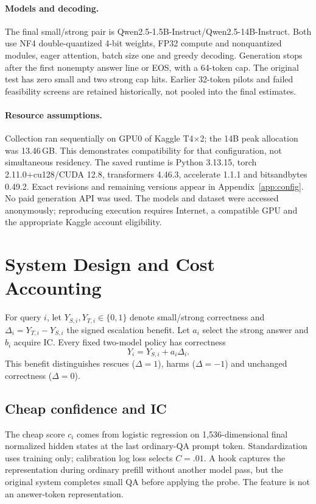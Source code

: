 \documentclass[11pt]{article}
\begin{document}
\paragraph{Models and decoding.}
The final small/strong pair is Qwen2.5-1.5B-Instruct/Qwen2.5-14B-Instruct. Both use NF4 double-quantized 4-bit weights, FP32 compute and nonquantized modules, eager attention, batch size one and greedy decoding. Generation stops after the first nonempty answer line or EOS, with a 64-token cap. The original test has zero small and two strong cap hits. Earlier 32-token pilots and failed feasibility screens are retained historically, not pooled into the final estimates.

\paragraph{Resource assumptions.}
Collection ran sequentially on GPU0 of Kaggle T4$\times$2; the 14B peak allocation was 13.46\,GB. This demonstrates compatibility for that configuration, not simultaneous residency. The saved runtime is Python 3.13.15, torch 2.11.0+cu128/CUDA 12.8, transformers 4.46.3, accelerate 1.1.1 and bitsandbytes 0.49.2. Exact revisions and remaining versions appear in Appendix~\ref{app:config}. No paid generation API was used. The models and dataset were accessed anonymously; reproducing execution requires Internet, a compatible GPU and the appropriate Kaggle account eligibility.

\section{System Design and Cost Accounting}
\label{sec:method}
For query $i$, let $Y_{S,i},Y_{T,i}\in\{0,1\}$ denote small/strong correctness and $\Delta_i=Y_{T,i}-Y_{S,i}$ the signed escalation benefit. Let $a_i$ select the strong answer and $b_i$ acquire IC. Every fixed two-model policy has correctness
\begin{equation}
Y_i=Y_{S,i}+a_i\Delta_i.
\end{equation}
This benefit distinguishes rescues ($\Delta=1$), harms ($\Delta=-1$) and unchanged correctness ($\Delta=0$).

\subsection{Cheap confidence and IC}
The cheap score $c_i$ comes from logistic regression on 1,536-dimensional final normalized hidden states at the last ordinary-QA prompt token. Standardization uses training only; calibration log loss selects $C=.01$. A hook captures the representation during ordinary prefill without another model pass, but the original system completes small QA before applying the probe. The feature is not an answer-token representation.
\end{document}
